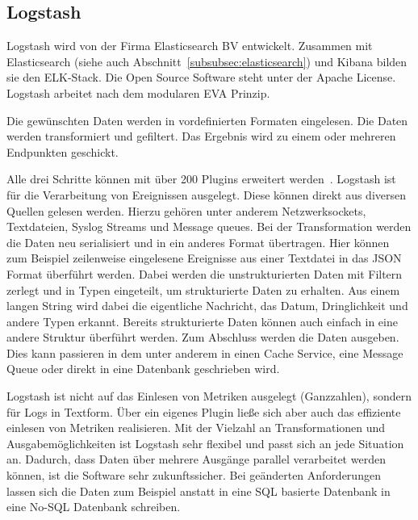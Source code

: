 \subsection{Logstash}
\label{subsec:logstash}
Logstash wird von der Firma Elasticsearch BV entwickelt. Zusammen mit
Elasticsearch (siehe auch Abschnitt~\ref{subsubsec:elasticsearch}) und
\gls{Kibana} bilden sie den ELK-Stack. Die Open Source Software steht unter der
Apache License. Logstash arbeitet nach dem modularen \gls{EVA} Prinzip.

\begin{outline}
  \1 Die gewünschten Daten werden in vordefinierten Formaten eingelesen.
  \1 Die Daten werden transformiert und gefiltert.
  \1 Das Ergebnis wird zu einem oder mehreren Endpunkten geschickt.
\end{outline}

Alle drei Schritte können mit über 200 Plugins erweitert
werden~\cite{logstash_overview}. Logstash ist für die Verarbeitung von
Ereignissen ausgelegt. Diese können direkt aus diversen Quellen gelesen werden.
Hierzu gehören unter anderem Netzwerksockets, Textdateien, Syslog Streams und
Message queues. Bei der Transformation werden die Daten neu serialisiert und in
ein anderes Format übertragen. Hier können zum Beispiel zeilenweise eingelesene
Ereignisse aus einer Textdatei in das \gls{JSON} Format überführt werden. Dabei
werden die unstrukturierten Daten mit Filtern zerlegt und in Typen eingeteilt,
um strukturierte Daten zu erhalten. Aus einem langen String wird dabei die
eigentliche Nachricht, das Datum, Dringlichkeit und andere Typen erkannt.
Bereits strukturierte Daten können auch einfach in eine andere Struktur
überführt werden. Zum Abschluss werden die Daten ausgeben. Dies kann passieren
in dem unter anderem in einen Cache Service, eine Message Queue oder direkt in
eine Datenbank geschrieben wird.

Logstash ist nicht auf das Einlesen von Metriken ausgelegt (Ganzzahlen),
sondern für Logs in Textform. Über ein eigenes Plugin ließe sich aber auch das
effiziente einlesen von Metriken realisieren. Mit der Vielzahl an
Transformationen und Ausgabemöglichkeiten ist Logstash sehr flexibel und passt
sich an jede Situation an. Dadurch, dass Daten über mehrere Ausgänge parallel
verarbeitet werden können, ist die Software sehr zukunftssicher. Bei geänderten
Anforderungen lassen sich die Daten zum Beispiel anstatt in eine SQL basierte
Datenbank in eine No-SQL Datenbank schreiben.
\tm%

